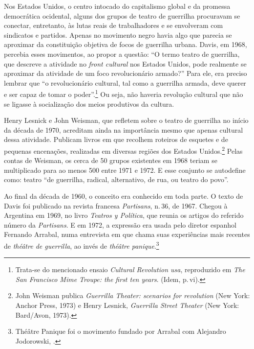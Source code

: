Nos Estados Unidos, o centro intocado do capitalismo global e da
promessa democrática ocidental, alguns dos grupos de teatro de guerrilha
procuravam se conectar, entretanto, às lutas reais de trabalhadores e se
envolveram com sindicatos e partidos. Apenas no movimento negro havia
algo que parecia se aproximar da constituição objetiva de focos de
guerrilha urbana. Davis, em 1968, percebia esses movimentos, ao propor a
questão: “O termo teatro de guerrilha, que descreve a atividade no
{\it front cultural} nos Estados Unidos, pode realmente se aproximar da
atividade de um foco revolucionário armado?” Para ele, era preciso
lembrar que “o revolucionário cultural, tal como a guerrilha armada,
deve querer e ser capaz de tomar o poder”.\footnote{Trata-se do
  mencionado ensaio {\it Cultural Revolution {\sc usa}}, reproduzido em
  {\it The San Francisco Mime Troupe: the first ten years}. (Idem, p.\,vi).} Ou seja, não haveria revolução cultural que não se ligasse à
socialização dos meios produtivos da cultura.

Henry Lesnick e John Weisman, que refletem sobre o teatro de guerrilha
no início da década de 1970, acreditam ainda na importância mesmo que
apenas cultural dessa atividade. Publicam livros em que recolhem
roteiros de esquetes e de pequenas encenações, realizadas em diversas
regiões dos Estados Unidos.\footnote{John Weisman publica {\it Guerrilla
  Theater: scenarios for revolution} (New York: Anchor Press, 1973) e
  Henry Lesnick, {\it Guerrilla Street Theater} (New York: Bard/Avon,
  1973).} Pelas contas de Weisman, os cerca de 50 grupos existentes em
1968 teriam se multiplicado para ao menos 500 entre 1971 e 1972. E esse
conjunto se autodefine como: teatro “de guerrilha, radical, alternativo,
de rua, ou teatro do povo”.

Ao final da década de 1960, o conceito era conhecido em toda parte. O
texto de Davis foi publicado na revista francesa {\it Partisans}, n.\,36,
de 1967. Chegou à Argentina em 1969, no livro {\it Teatros y Política},
que reunia os artigos do referido número da {\it Partisans}. E em 1972,
a expressão era usada pelo diretor espanhol Fernando Arrabal, numa
entrevista em que chama suas experiências mais recentes de {\it théâtre
de guerrilla}, ao invés de {\it théâtre panique}.\footnote{Théâtre
  Panique foi o movimento fundado por Arrabal com Alejandro Jodorowski,
  .}

